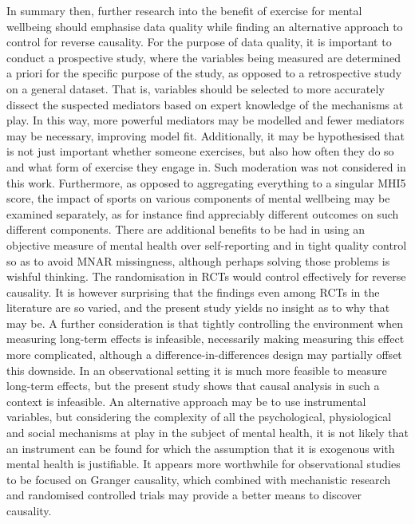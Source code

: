 In summary then, further research into the benefit of exercise for mental wellbeing should emphasise data quality
while finding an alternative approach to control for reverse causality.
For the purpose of data quality, it is important to conduct a prospective study, where the variables being measured
are determined a priori for the specific purpose of the study, as opposed to a retrospective study on a general dataset.
That is, variables should be selected to more accurately dissect the suspected mediators based on expert knowledge
of the mechanisms at play. In this way, more powerful mediators may be modelled and fewer mediators may be necessary,
improving model fit.
Additionally, it may be hypothesised that is not just important whether someone exercises, but also how often they do so
and what form of exercise they engage in. Such moderation was not considered in this work.
Furthermore, as opposed to aggregating everything to a singular MHI5 score,
the impact of sports on various components of mental wellbeing may be examined separately, as for instance
 find appreciably different outcomes on such different components.
There are additional benefits to be had in using an objective measure of mental health over self-reporting and in
tight quality control so as to avoid MNAR missingness, although perhaps solving those problems is wishful thinking.
The randomisation in RCTs would control effectively for reverse causality. It is however surprising that
the findings even among RCTs in the literature are so varied, and the present study yields no insight as to why that may be.
A further consideration is that tightly controlling the environment when measuring long-term effects is infeasible,
necessarily making measuring this effect more complicated, although a difference-in-differences design may partially
offset this downside.
In an observational setting it is much more feasible to measure long-term effects, but the present study shows
that causal analysis in such a context is infeasible. An alternative approach may be to use instrumental variables,
but considering the complexity of all the psychological, physiological and social mechanisms at play in the subject of
mental health, it is not likely that an instrument can be found for which the assumption that it is exogenous
with mental health is justifiable.
It appears more worthwhile for observational studies to be focused on Granger causality, which combined with
mechanistic research and randomised controlled trials may provide a better means to discover causality.
